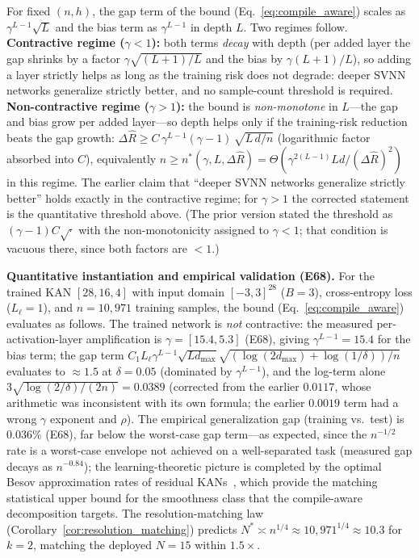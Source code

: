 \vspace{4pt}
\begin{corollary}
\label{cor:depth_threshold}
For fixed $(n, h)$, the gap term of the bound (Eq.~\ref{eq:compile_aware})
scales as $\gamma^{L-1}\sqrt{L}$ and the bias term as $\gamma^{L-1}$ in
depth $L$. Two regimes follow.
\textbf{Contractive regime ($\gamma < 1$):} both terms \emph{decay} with
depth (per added layer the gap shrinks by a factor
$\gamma\sqrt{(L+1)/L}$ and the bias by $\gamma (L+1)/L$), so adding a
layer strictly helps as long as the training risk does not degrade:
deeper SVNN networks generalize strictly better, and no sample-count
threshold is required.
\textbf{Non-contractive regime ($\gamma > 1$):} the bound is
\emph{non-monotone} in $L$---the gap and bias grow per added layer---so
depth helps only if the training-risk reduction beats the gap growth:
$\Delta \hat{R} \geq C\, \gamma^{L-1}(\gamma-1)\, \sqrt{L\, d/n}$
(logarithmic factor absorbed into $C$), equivalently
$n \geq n^{*}(\gamma, L, \Delta \hat{R}) =
\Theta(\gamma^{2(L-1)} L d / (\Delta \hat{R})^2)$ in this regime.
The earlier claim that ``deeper SVNN networks generalize strictly
better'' holds exactly in the contractive regime; for $\gamma>1$ the
corrected statement is the quantitative threshold above. (The prior
version stated the threshold as $(\gamma-1)C\sqrt{\cdot}$ with the
non-monotonicity assigned to $\gamma<1$; that condition is vacuous
there, since both factors are $<1$.)
\end{corollary}

\vspace{4pt}
\noindent\textbf{Quantitative instantiation and empirical validation (E68).}
For the trained KAN $[28,16,4]$ with input domain $[-3,3]^{28}$ ($B=3$),
cross-entropy loss ($L_\ell = 1$), and $n=10{,}971$ training samples, the
bound (Eq.~\eqref{eq:compile_aware}) evaluates as follows. The trained
network is \emph{not} contractive: the measured per-activation-layer
amplification is $\gamma = [15.4, 5.3]$ (E68), giving
$\gamma^{L-1} = 15.4$ for the bias term; the gap term
$C_1 L_\ell \gamma^{L-1}\sqrt{L d_{\max}}\sqrt{(\log(2d_{\max}) +
\log(1/\delta))/n}$ evaluates to $\approx 1.5$ at $\delta = 0.05$
(dominated by $\gamma^{L-1}$), and the log-term alone
$3\sqrt{\log(2/\delta)/(2n)} = 0.0389$ (corrected from the earlier
$0.0117$, whose arithmetic was inconsistent with its own formula; the
earlier $0.0019$ term had a wrong $\gamma$ exponent and $\rho$). The
empirical generalization gap (training vs.\ test) is $0.036\%$
(E68), far below the worst-case gap term---as expected, since the
$n^{-1/2}$ rate is a worst-case envelope not achieved on a
well-separated task (measured gap decays as $n^{-0.84}$); the
learning-theoretic picture is completed by the optimal Besov
approximation rates of residual KANs~\cite{kratsios2025reskan}, which
provide the matching statistical upper bound for the smoothness class
that the compile-aware decomposition targets. The
resolution-matching law (Corollary~\ref{cor:resolution_matching})
predicts $N^{*} \asymp n^{1/4} \approx 10{,}971^{1/4} \approx 10.3$
for $k=2$, matching the deployed $N = 15$ within $1.5\times$.

